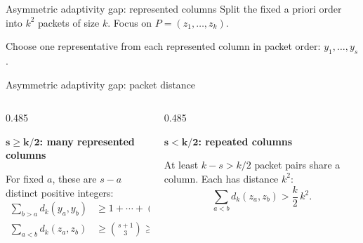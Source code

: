 \documentclass[aspectratio=169,12pt]{beamer}
\begin{document}
\begin{frame}{Asymmetric adaptivity gap: represented columns}
  \small
  Split the fixed a priori order into \(k^2\) packets of size \(k\).
  Focus on \(P=(z_1,\ldots,z_k)\).

  \vspace{0.04cm}
  \makebox[\linewidth][c]{%
    \resizebox{0.82\linewidth}{!}{\ThPacketColumns}%
  }

  \vspace{0.30cm}

  Choose one representative from each represented column in packet order:
  \(y_1,\ldots,y_s\).
\end{frame}

\begin{frame}{Asymmetric adaptivity gap: packet distance}
  \begin{columns}[T,onlytextwidth]
    \begin{column}{0.485\textwidth}
      {\fontsize{11.2pt}{13.2pt}\selectfont\bfseries\color{ThBlue}
        \(\boldsymbol{\mathbf{s\ge k/2}}\): many represented columns\par}

      \vspace{0.04cm}
      \makebox[\linewidth][c]{%
        \resizebox{0.90\linewidth}{!}{\ThManyRepresentedCase}%
      }

      {\fontsize{10.2pt}{12.2pt}\selectfont
        For fixed \(a\), these are \(s-a\) distinct positive integers:
        \[
          \begin{aligned}
            \sum_{b>a}d_k(y_a,y_b)
            &\ge1+\cdots+(s-a),\\
            \sum_{a<b}d_k(z_a,z_b)
            &\ge\binom{s+1}{3}\ge\frac{k^3}{96}.
          \end{aligned}
        \]
      }
    \end{column}
    \begin{column}{0.485\textwidth}
      {\fontsize{11.2pt}{13.2pt}\selectfont\bfseries\color{ThCoral}
        \(\boldsymbol{\mathbf{s<k/2}}\): repeated columns\par}

      \vspace{0.04cm}
      \makebox[\linewidth][c]{%
        \resizebox{0.90\linewidth}{!}{\ThRepeatedColumnsCase}%
      }

      {\fontsize{10.2pt}{12.2pt}\selectfont
        At least \(k-s>k/2\) packet pairs share a column.
        Each has distance \(k^2\):
        \[
          \sum_{a<b}d_k(z_a,z_b)
          >\frac{k}{2}\,k^2.
        \]
      }
    \end{column}
  \end{columns}

\end{frame}
\end{document}
